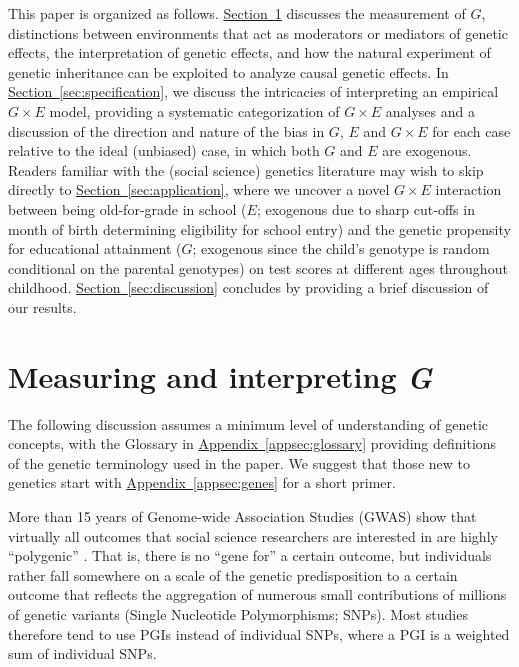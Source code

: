 \documentclass[12pt,a4paper]{article}
\begin{document}
\begin{bibunit}
This paper is organized as follows. \hyperref[sec:G]{Section~\ref*{sec:G}} discusses the measurement of $G$, distinctions between environments that act as moderators or mediators of genetic effects, the interpretation of genetic effects, and how the natural experiment of genetic inheritance can be exploited to analyze causal genetic effects. 
In \hyperref[sec:specification]{Section~\ref*{sec:specification}}, we discuss the intricacies of interpreting an empirical $G \times E$ model, providing a systematic categorization of $G \times E$ analyses and a discussion of the direction and nature of the bias in $G$, $E$ and $G \times E$ for each case relative to the ideal (unbiased) case, in which both $G$ and $E$ are exogenous. 
Readers familiar with the (social science) genetics literature may wish to skip directly to \hyperref[sec:application]{Section~\ref*{sec:application}}, where we uncover a novel $G \times E$ interaction between being old-for-grade in school ($E$; exogenous due to sharp cut-offs in month of birth determining eligibility for school entry) and the genetic propensity for educational attainment ($G$; exogenous since the child's genotype is random conditional on the parental genotypes) on test scores at different ages throughout childhood. \hyperref[sec:discussion]{Section~\ref*{sec:discussion}} concludes by providing a brief discussion of our results. 

\section{Measuring and interpreting \textit{G}} 
\label{sec:G}
The following discussion assumes a minimum level of understanding of genetic concepts, with the Glossary in \hyperref[appsec:glossary]{Appendix~\ref*{appsec:glossary}} providing definitions of the genetic terminology used in the paper. We suggest that those new to genetics start with \hyperref[appsec:genes]{Appendix~\ref*{appsec:genes}} for a short primer.

More than 15 years of Genome-wide Association Studies (GWAS) show that virtually all outcomes that social science researchers are interested in are highly ``polygenic'' \citep{visscher2008heritability,Loos2020,Abdellaoui2023}. That is, there is no ``gene for'' a certain outcome, but individuals rather fall somewhere on a scale of the genetic predisposition to a certain outcome that reflects the aggregation of numerous small contributions of millions of genetic variants (Single Nucleotide Polymorphisms; SNPs). Most studies therefore tend to use PGIs \citep{Becker2021} instead of individual SNPs, where a PGI is a weighted sum of individual SNPs. 


\end{bibunit}
\end{document}
